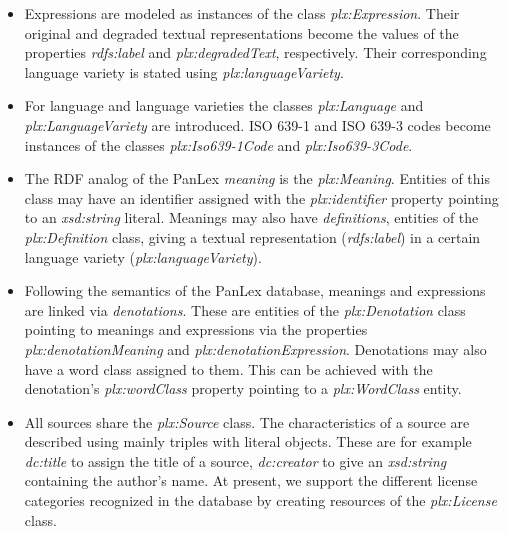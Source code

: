 \documentclass[sw]{iosart2c}
\begin{document}
\begin{itemize}
  \item Expressions are modeled as instances of the class \emph{plx:Expression}.
    Their original and degraded textual representations become the values of the properties \emph{rdfs:label} and \emph{plx:degradedText}, respectively.
    Their corresponding language variety is stated using \emph{plx:languageVariety}.
  \item For language and language varieties the classes \emph{plx:Language} and \emph{plx:LanguageVariety} are introduced.
    ISO 639-1 and ISO 639-3 codes become instances of the classes \emph{plx:Iso639-1Code} and \emph{plx:Iso639-3Code}.
  \item The RDF analog of the PanLex \emph{meaning} is the \emph{plx:Meaning}.
    Entities of this class may have an identifier assigned with the \emph{plx:identifier} property pointing to an \emph{xsd:string} literal.
    Meanings may also have \emph{definitions}, entities of the \emph{plx:Definition} class, giving a textual representation (\emph{rdfs:label}) in a certain language variety (\emph{plx:languageVariety}).
  \item Following the semantics of the PanLex database, meanings and expressions are linked via \emph{denotations}.
    These are entities of the \emph{plx:Denotation} class pointing to meanings and expressions via the properties \emph{plx:denotationMeaning} and \emph{plx:\-denotation\-Expression}.
    Denotations may also have a word class assigned to them.
    This can be achieved with the denotation's \emph{plx:wordClass} property pointing to a \emph{plx:WordClass} entity.
  \item All sources share the \emph{plx:Source} class.
    The characteristics of a source are described using mainly triples with literal objects.
    These are for example \emph{dc:title} to assign the title of a source, \emph{dc:creator} to give an \emph{xsd:string} containing the author's name.
    At present, we support the different license categories recognized in the database by creating resources of the \emph{plx:License} class.
\end{itemize}
\end{document}

